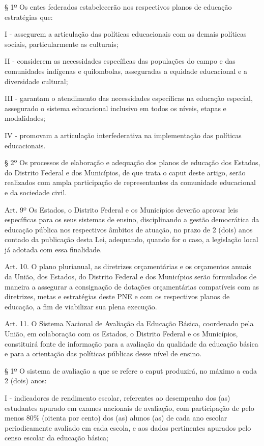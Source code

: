 \documentclass[
]{book}
\begin{document}
§ 1º Os entes federados estabelecerão nos respectivos planos de educação estratégias que:

I - assegurem a articulação das políticas educacionais com as demais políticas sociais, particularmente as culturais;

II - considerem as necessidades específicas das populações do campo e das comunidades indígenas e quilombolas, asseguradas a equidade educacional e a diversidade cultural;

III - garantam o atendimento das necessidades específicas na educação especial, assegurado o sistema educacional inclusivo em todos os níveis, etapas e modalidades;

IV - promovam a articulação interfederativa na implementação das políticas educacionais.

§ 2º Os processos de elaboração e adequação dos planos de educação dos Estados, do Distrito Federal e dos Municípios, de que trata o caput deste artigo, serão realizados com ampla participação de representantes da comunidade educacional e da sociedade civil.

Art. 9º Os Estados, o Distrito Federal e os Municípios deverão aprovar leis específicas para os seus sistemas de ensino, disciplinando a gestão democrática da educação pública nos respectivos âmbitos de atuação, no prazo de 2 (dois) anos contado da publicação desta Lei, adequando, quando for o caso, a legislação local já adotada com essa finalidade.

Art. 10. O plano plurianual, as diretrizes orçamentárias e os orçamentos anuais da União, dos Estados, do Distrito Federal e dos Municípios serão formulados de maneira a assegurar a consignação de dotações orçamentárias compatíveis com as diretrizes, metas e estratégias deste PNE e com os respectivos planos de educação, a fim de viabilizar sua plena execução.

Art. 11. O Sistema Nacional de Avaliação da Educação Básica, coordenado pela União, em colaboração com os Estados, o Distrito Federal e os Municípios, constituirá fonte de informação para a avaliação da qualidade da educação básica e para a orientação das políticas públicas desse nível de ensino.

§ 1º O sistema de avaliação a que se refere o caput produzirá, no máximo a cada 2 (dois) anos:

I - indicadores de rendimento escolar, referentes ao desempenho dos (as) estudantes apurado em exames nacionais de avaliação, com participação de pelo menos 80\% (oitenta por cento) dos (as) alunos (as) de cada ano escolar periodicamente avaliado em cada escola, e aos dados pertinentes apurados pelo censo escolar da educação básica;
\end{document}
